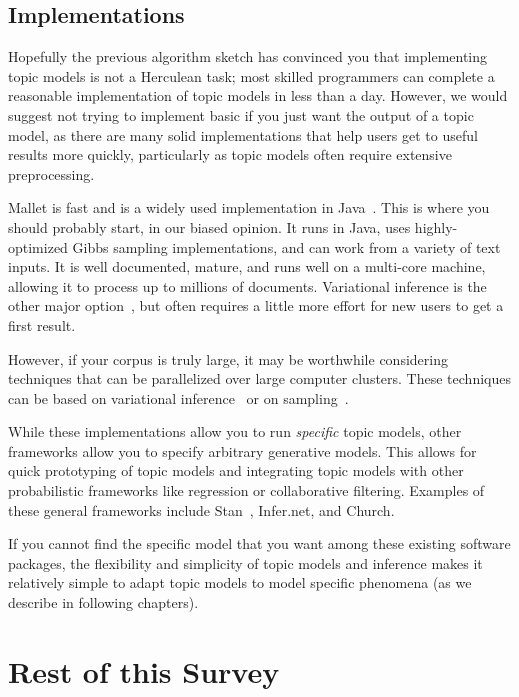 \subsection{Implementations}

Hopefully the previous algorithm sketch has convinced you that implementing
topic models is not a Herculean task; most skilled programmers can complete a
reasonable implementation of topic models in less than a day.  However, we would
suggest not trying to implement basic  if you just want the
output of a topic model, as there are many solid
implementations that help users get to useful results more quickly, particularly
as topic models often require extensive preprocessing.

Mallet is fast and is a widely used implementation in Java~\citep{mallet}.  This
is where you should probably start, in our biased opinion.  It runs in Java, uses
highly-optimized Gibbs sampling implementations, and can work from a variety of
text inputs.  It is well documented, mature, and runs well on a multi-core
machine, allowing it to process up to millions of documents.  Variational
inference is the other major option~\citep{blei-03,vw}, but often requires a
little more effort for new users to get a first result.

However, if your corpus is truly large, it may be worthwhile
considering techniques that can be parallelized over large computer
clusters.  These techniques can be based on variational
inference~\citep{Narayanamurthy-11,zhai-12} or on
sampling~\citep{newman-08}.

While these implementations allow you to run \emph{specific} topic models, other
frameworks allow you to specify arbitrary generative
models.  This allows for quick prototyping of topic models and integrating topic
models with other probabilistic frameworks like regression or collaborative
filtering.  Examples of these general frameworks include
Stan~\citep{stan-software:2014}, Infer.net, and Church.

If you cannot find the specific model that you want among these
existing software packages, the flexibility and simplicity of topic
models and inference makes it relatively simple to adapt topic models
to model specific phenomena (as we describe in following chapters).

\section{Rest of this Survey}


